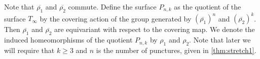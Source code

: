 Note that $\overline{\rho_1}$ and $\overline{\rho_2}$ commute. Define the surface $P_{n,k}$ as the quotient of the surface $T_\infty$ by the
covering action of the group generated by $(\overline{\rho_1})^n$ and $(\overline{\rho_2})^k$. Then
$\overline{\rho_1}$ and $\overline{\rho_2}$ are equivariant with respect to the covering map.  We denote the induced homeomorphisms of the quotient $P_{n,k}$ by $\rho_1$
and $\rho_2$.  Note that later we will require that $k\geq 3$ and $n$ is the number of punctures, given in \autoref{thm:stretch1}.


